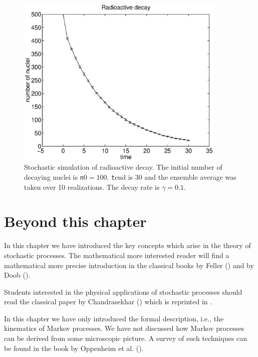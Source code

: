 \begin{figure}
\label{F_OS_DECAY}
\includegraphics[width=10cm]{./Figures/f_os_decay.eps}
\caption{Stochastic simulation of radioactive decay. The initial
  number of decaying nuclei is {\texttt n0}$= 100$. {\texttt tend}
is 30 and the ensemble average was taken over 10 realizations.
The decay rate is $\gamma=0.1$.}
\end{figure}  
\section{Beyond this chapter}
In this chapter we have introduced the key concepts which arise
in the theory of stochastic processes. The mathematical more 
interested reader will find a mathematical more precise introduction 
in the classical books by Feller
(\cite{FELLER}) and by Doob (\cite{DOOB}). 

Students interested in the physical applications of stochastic processes
should read the classical paper by Chandrasekhar 
(\cite{CHANDRASEKHAR}) which is reprinted in \cite{WAX}.

In this chapter we have only introduced the formal description,
i.e., the kinematics of Markov processes. We have not discussed
how Markov processes can be derived from some microscopic picture.
A survey of such techniques can be found in the book by Oppenheim 
et al. (\cite{OPPENHEIM}).








